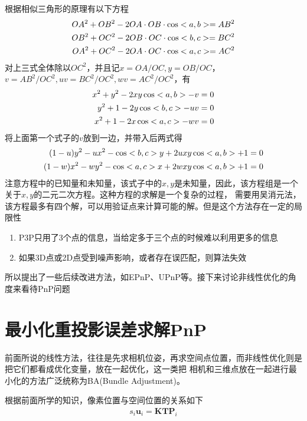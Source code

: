 \documentclass[10pt]{article}
\begin{document}
根据相似三角形的原理有以下方程
\begin{align} 
    OA^{2}+OB^{2}-2OA\cdot OB\cdot\cos<a,b> =AB^{2} \notag \\
    OB^{2}+OC^{2}-2OB\cdot OC\cdot\cos<b,c> =BC^{2}  \\
    OA^{2}+OC^{2}-2OA\cdot OC\cdot\cos<a,c> =AC^{2} \notag  
\end{align}
对上三式全体除以$OC^{2}$，并且记$x=OA/OC,y=OB/OC$，$v=AB^{2}/OC^{2},uv=BC^{2}/OC^{2},wv=AC^{2}/OC^{2}$，有
\begin{align} 
    x^{2}+y^{2}-2xy\cos<a,b> -v=0 \notag \\
    y^{2}+1-2y\cos<b,c> - uv=0 \\
    x^{2}+1-2x\cos<a,c> - wv=0 \notag
\end{align}
将上面第一个式子的$v$放到一边，并带入后两式得
\begin{align} 
    (1-u)y^{2}-ux^{2}-\cos<b,c>y+2uxy\cos<a,b>+1=0 \notag \\
    (1-w)x^{2}-wy^{2}-\cos<a,c>x+2wxy\cos<a,b>+1=0
\end{align}
注意方程中的已知量和未知量，该式子中的$x,y$是未知量，因此，该方程组是一个关于$x,y$的二元二次方程。这种方程的求解是一个复杂的过程，
需要用吴消元法，该方程最多有四个解，可以用验证点来计算可能的解。但是这个方法存在一定的局限性
\begin{enumerate}
    \item P3P只用了3个点的信息，当给定多于三个点的时候难以利用更多的信息
    \item 如果3D点或2D点受到噪声影响，或者存在误匹配，则算法失效
\end{enumerate}
所以提出了一些后续改进方法，如EPnP、UPnP等。接下来讨论非线性优化的角度来看待PnP问题
\section{最小化重投影误差求解PnP}
前面所说的线性方法，往往是先求相机位姿，再求空间点位置，而非线性优化则是把它们都看成优化变量，放在一起优化，这一类把
相机和三维点放在一起进行最小化的方法广泛统称为BA(Bundle Adjustment)。

根据前面所学的知识，像素位置与空间位置的关系如下
\begin{align} 
    s_i\mathbf{u}_i=\mathbf{K}\mathbf{T}\mathbf{P}_i 
\end{align} 
\end{document}
